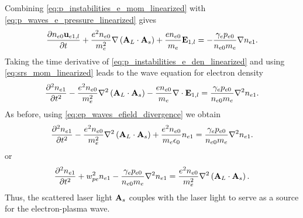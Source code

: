 \documentclass[a4paper,11pt]{report}
\begin{document}
Combining \cref{eq:p_instabilities_e_mom_linearized} with \cref{eq:p_waves_e_pressure_linearized} gives 
\begin{equation}
    \label{eq:srs_mom_linearized}
    \frac{\partial n_{e0} \mathbf{u}_{e1,l}}{\partial t} + \frac{e^2 n_{e0}}{m_e^2} \nabla \left (\mathbf{A}_L \cdot \mathbf{A}_s \right ) + \frac{e n_{e0}}{m_e} \mathbf{E}_{1,l} = -\frac{\gamma_e p_{e0}}{n_{e0} m_e} \nabla n_{e1}.
\end{equation}
Taking the time derivative of \cref{eq:p_instabilities_e_den_linearized} and using \cref{eq:srs_mom_linearized} leads to the wave equation for electron density
\begin{equation*}
    \frac{\partial^2 n_{e1}}{\partial t^2} - \frac{e^2 n_{e0}}{m_e^2} \nabla^2 \left (\mathbf{A}_L \cdot \mathbf{A}_s \right ) - \frac{e n_{e0}}{m_e} \nabla \cdot \mathbf{E}_{1,l} = \frac{\gamma_e p_{e0}}{n_{e0} m_e} \nabla^2 n_{e1}.
\end{equation*}
As before, using \cref{eq:ep_waves_efield_divergence} we obtain
\begin{equation*}
    \frac{\partial^2 n_{e1}}{\partial t^2} - \frac{e^2 n_{e0}}{m_e^2} \nabla^2 \left (\mathbf{A}_L \cdot \mathbf{A}_s \right ) + \frac{e^2 n_{e0}}{m_e \epsilon_0} n_{e1} = \frac{\gamma_e p_{e0}}{n_{e0} m_e} \nabla^2 n_{e1}.
\end{equation*}
or
\begin{equation}
    \frac{\partial^2 n_{e1}}{\partial t^2} + w_{pe}^2 n_{e1} - \frac{\gamma_e p_{e0}}{n_{e0} m_e} \nabla^2 n_{e1} =   \frac{e^2 n_{e0}}{m_e^2} \nabla^2 \left (\mathbf{A}_L \cdot \mathbf{A}_s \right ).
\end{equation}
Thus, the scattered laser light $\mathbf{A}_s$ couples with the laser light to serve as a source for the electron-plasma wave.

\end{document}
